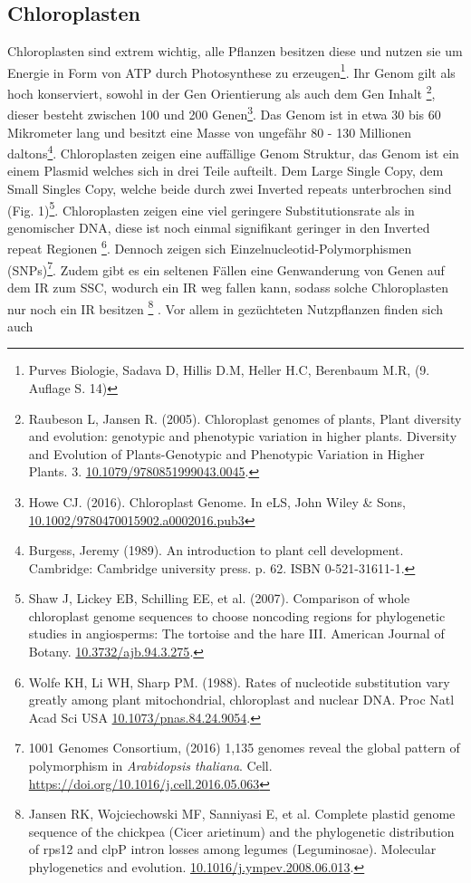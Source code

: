 \documentclass{scrartcl}
\begin{document}
\subsection{Chloroplasten}
\label{sec-2-1}
Chloroplasten sind extrem wichtig, alle Pflanzen besitzen diese und nutzen sie um Energie in Form von ATP durch Photosynthese zu erzeugen\footnote{Purves Biologie, Sadava D, Hillis D.M, Heller H.C, Berenbaum M.R, (9. Auflage S. 14)}.
Ihr Genom gilt als hoch konserviert, sowohl in der Gen Orientierung als auch dem Gen Inhalt \footnote{Raubeson L, Jansen R. (2005). Chloroplast genomes of plants, Plant diversity and evolution: genotypic and phenotypic variation in higher plants. Diversity and Evolution of Plants-Genotypic and Phenotypic Variation in Higher Plants. 3. \url{10.1079/9780851999043.0045}.}, dieser besteht zwischen 100 und 200 Genen\footnote{Howe CJ. (2016). Chloroplast Genome. In eLS, John Wiley \& Sons,  \url{10.1002/9780470015902.a0002016.pub3}}. 
Das Genom ist in etwa 30 bis 60 Mikrometer lang und besitzt eine Masse von ungefähr 80 - 130 Millionen daltons\footnote{Burgess, Jeremy (1989). An introduction to plant cell development. Cambridge: Cambridge university press. p. 62. ISBN 0-521-31611-1.}.
Chloroplasten zeigen
eine auffällige Genom Struktur, das Genom ist ein einem Plasmid welches sich in drei Teile aufteilt. Dem Large Single Copy, dem 
Small Singles Copy, welche beide durch zwei Inverted repeats unterbrochen sind (Fig. 1)\footnote{Shaw J, Lickey EB, Schilling EE, et al. (2007). Comparison of whole chloroplast genome sequences to choose noncoding regions for phylogenetic studies in angiosperms: The tortoise and the hare III. American Journal of Botany. \url{10.3732/ajb.94.3.275}.}. Chloroplasten zeigen eine viel geringere Substitutionsrate
als in genomischer DNA, diese ist noch einmal signifikant geringer in den Inverted repeat Regionen \footnote{Wolfe KH, Li WH, Sharp PM. (1988). Rates of nucleotide substitution vary greatly among plant mitochondrial, chloroplast and nuclear DNA. Proc Natl Acad Sci USA \url{10.1073/pnas.84.24.9054}.}. Dennoch zeigen sich
Einzelnucleotid-Polymorphismen (SNPs)\footnote{1001 Genomes Consortium, (2016) 1,135 genomes reveal the global pattern of polymorphism in \emph{Arabidopsis thaliana}. Cell. \url{https://doi.org/10.1016/j.cell.2016.05.063}}. Zudem gibt es ein seltenen Fällen eine Genwanderung von Genen auf dem IR zum SSC, wodurch ein IR weg
fallen kann, sodass solche Chloroplasten nur noch ein IR besitzen \footnote{Jansen RK, Wojciechowski MF, Sanniyasi E, et al. Complete plastid genome sequence of the chickpea (Cicer arietinum) and the phylogenetic distribution of rps12 and clpP intron losses among legumes (Leguminosae). Molecular phylogenetics and evolution. \url{10.1016/j.ympev.2008.06.013}.} . Vor allem in gezüchteten Nutzpflanzen finden sich auch 
\end{document}
